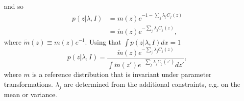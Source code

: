 and so
\begin{equation}
	\begin{split}
		p(z|\lambda, I)&=m(z)e^{-1-\sum_{j}\lambda_{j}C_j(z)}\\
		&=\tilde{m}(z)e^{-\sum_{j}\lambda_{j}C_j(z)},
	\end{split}
\end{equation}
where $\tilde{m}(z)\equiv m(z)e^{-1}$. Using that $\int p(z|\lambda, I) dx =1$
\begin{equation}
	p(z|\lambda, I)=\frac{\tilde{m}(z)e^{-\sum_{j}\lambda_{j}C_j(z)}}{\int \tilde{m}(z')e^{-\sum_{j}\lambda_{j}C_j(z')}dz'},
\end{equation}
where $m$ is a reference distribution that is invariant under parameter transformations. $\lambda_j$ are determined from the additional constraints, e.g. on the mean or variance.

